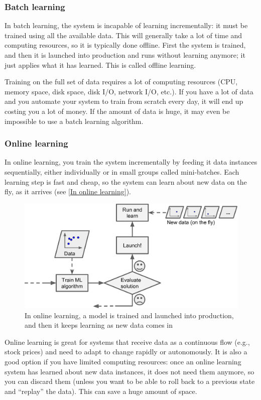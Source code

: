 \subsubsection{Batch learning}
In batch learning, the system is incapable of learning incrementally: it must be trained
using all the available data. This will generally take a lot of time and computing
resources, so it is typically done offline. First the system is trained, and then it is
launched into production and runs without learning anymore; it just applies what it
has learned. This is called offline learning.

Training on the full set of data requires a lot of computing resources (CPU,
memory space, disk space, disk I/O, network I/O, etc.). If you have a lot of data and
you automate your system to train from scratch every day, it will end up costing you a
lot of money. If the amount of data is huge, it may even be impossible to use a batch
learning algorithm.

\subsubsection{Online learning}
In online learning, you train the system incrementally by feeding it data instances
sequentially, either individually or in small groups called mini-batches. Each learning
step is fast and cheap, so the system can learn about new data on the fly, as it arrives
(see \autoref{In online learning}).
\begin{figure}
\centering
\includegraphics{img/online learning.png}
\caption{In online learning, a model is trained and launched into production, and
then it keeps learning as new data comes in}
\label{In online learning}
\end{figure}

Online learning is great for systems that receive data as a continuous flow (e.g., stock
prices) and need to adapt to change rapidly or autonomously. It is also a good option
if you have limited computing resources: once an online learning system has learned
about new data instances, it does not need them anymore, so you can discard them
(unless you want to be able to roll back to a previous state and “replay” the data). This
can save a huge amount of space.

